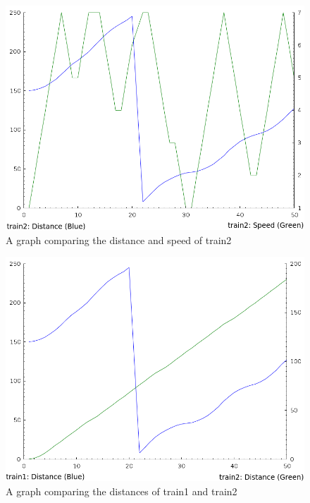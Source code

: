 \begin{figure}
\begin{center}
\includegraphics[scale=0.64]{t2graph.png}
\end{center}
\caption{A graph comparing the distance and speed of train2}
\end{figure}

\begin{figure}
\label{t1t2graph}
\begin{center}
\includegraphics[scale=0.64]{t1t2graph.png}
\end{center}
\caption{A graph comparing the distances of train1 and train2}
\end{figure}

